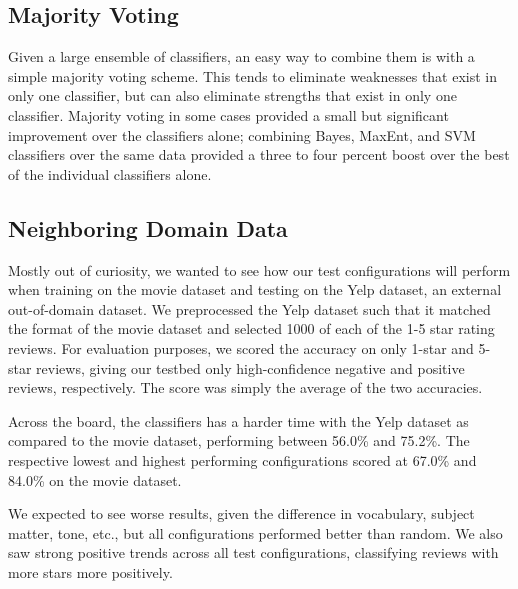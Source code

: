 \documentclass[10pt,twocolumn,letterpaper]{article}
\begin{document}
\subsection{Majority Voting}
Given a large ensemble of classifiers, an easy way to combine them is with a simple majority voting scheme. This tends to eliminate weaknesses that exist in only one classifier, but can also eliminate strengths that exist in only one classifier.
Majority voting in some cases provided a small but significant improvement over the classifiers alone; combining Bayes, MaxEnt, and SVM classifiers over the same data provided a three to four percent boost over the best of the individual classifiers alone.

\subsection{Neighboring Domain Data}
Mostly out of curiosity, we wanted to see how our test configurations will perform when training on the movie dataset and testing on the Yelp dataset, an external out-of-domain dataset. We preprocessed the Yelp dataset such that it matched the format of the movie dataset and selected 1000 of each of the 1-5 star rating reviews. For evaluation purposes, we scored the accuracy on only 1-star and 5-star reviews, giving our testbed only high-confidence negative and positive reviews, respectively. The score was simply the average of the two accuracies.

Across the board, the classifiers has a harder time with the Yelp dataset as compared to the movie dataset, performing between 56.0\% and 75.2\%. The respective lowest and highest performing configurations scored at 67.0\% and 84.0\% on the movie dataset.

We expected to see worse results, given the difference in vocabulary, subject matter, tone, etc., but all configurations performed better than random. We also saw strong positive trends across all test configurations, classifying reviews with more stars more positively.
\end{document}
